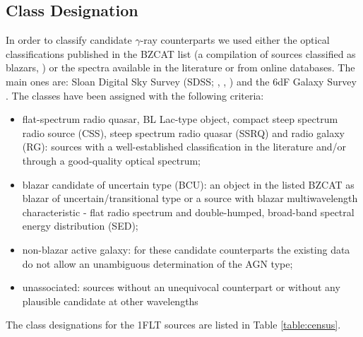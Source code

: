 \documentclass{aastex62}
\begin{document}
\subsection{Class Designation}\label{sec:class} 
In order to classify candidate $\gamma$-ray counterparts we used either the optical classifications published in the BZCAT list (a compilation of sources  classified as blazars, \citealt{massaro20155th}) or the spectra available in the literature or from online databases. The main ones are: Sloan Digital Sky Survey (SDSS; \citealt{abolfathi2018fourteenth}, \citealt{albareti201713th}, \citealt{alam2015eleventh}) and the 6dF Galaxy Survey \citep{jones20096df}.
The classes have been assigned with the following criteria:
\begin{itemize}
    \item flat-spectrum radio quasar, BL Lac-type object, compact steep spectrum radio source (CSS), steep spectrum radio quasar (SSRQ) and radio galaxy (RG): sources with a well-established classification in the literature and/or through a good-quality optical spectrum;
    \item blazar candidate of uncertain type (BCU): an object in the listed BZCAT as blazar of uncertain/transitional type or a source with blazar multiwavelength characteristic - flat radio spectrum and double-humped, broad-band spectral energy distribution (SED);
    \item non-blazar active galaxy: for these candidate counterparts the existing data do not allow an unambiguous determination of the AGN type;
    \item unassociated: sources without an unequivocal counterpart or without any plausible candidate at other wavelengths
\end{itemize}
The class  designations for the 1FLT sources are listed in Table \ref{table:census}.
\end{document}
